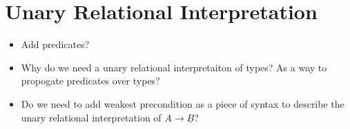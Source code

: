 \documentclass{article}
\begin{document}
\section{Unary Relational Interpretation}
\begin{itemize}
    \item Add predicates?
    \item Why do we need a unary relational interpretaiton of types? As a way to propogate predicates over types?
    \item Do we need to add weakest precondition as a piece of syntax to describe the unary relational interpretation of $A \rightarrow \underline{B}$?
\end{itemize}
\end{document}
